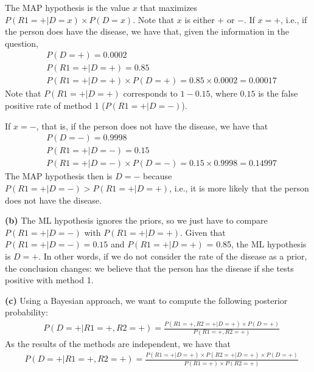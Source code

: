 \documentclass[leqno]{article}
\begin{document}
\noindent The MAP hypothesis is the value $x$ that maximizes $P(R1 = +|D = x) \times P(D = x)$.
Note that $x$ is either $+$ or $-$. If $x = +$, i.e., if the person does have the disease,
we have that, given the information in the question,
\begin{equation*}
\begin{split}  
&P(D = +) = 0.0002
\\
&P(R1 = +|D = +) = 0.85
\\
&P(R1 = +|D = +) \times P(D = +) = 0.85 \times 0.0002 = 0.00017
\end{split}  
\end{equation*}
\noindent Note that $P(R1 = +|D = +)$ corresponds to $1 - 0.15$, where $0.15$ is the false positive 
rate of method 1 ($P(R1 = +|D = -)$).

\noindent If $x = -$, that is, if the person does not have the disease, we have that
\begin{equation*}
\begin{split}  
&P(D = -) = 0.9998
\\
&P(R1 = +|D = -) = 0.15
\\
&P(R1 = +|D = -) \times P(D = -) = 0.15 \times 0.9998 = 0.14997
\end{split}  
\end{equation*}
\noindent The MAP hypothesis then is $D = -$ because $P(R1 = + | D = -) > P(R1 = + | D = +)$, i.e., it is more likely that the person does
not have the disease.

\hfill

\noindent \textbf{(b)} The ML hypothesis ignores the priors, so we just have to compare
$P(R1 = +|D = -)$ with $P(R1 = +|D = +)$. Given that $P(R1 = +|D = -) = 0.15$ and
$P(R1 = +|D = +)$ = 0.85, the ML hypothesis is $D = +$. In other words, if we do not consider
the rate of the disease as a prior, the conclusion changes: we believe that the person has
the disease if she tests positive with method 1.

\hfill

\noindent \textbf{(c)} Using a Bayesian approach, we want to compute the following
posterior probability:
\begin{equation*}
\begin{split}
&P(D = +| R1 = +, R2 = +) = \frac{P(R1 = +, R2 = +| D = +) \times P(D = +)}{P(R1 = +, R2 = +)}
\end{split}  
\end{equation*}  
As the results of the methods are independent, we have that
\begin{equation}
\begin{split}
&P(D = +| R1 = +, R2 = +) = \frac{P(R1 = +|D = +) \times P(R2 = +| D = +) \times P(D = +)}{P(R1 = +) \times P(R2 = +)}
\end{split}
\label{eq2}
\end{equation}  
\end{document}
